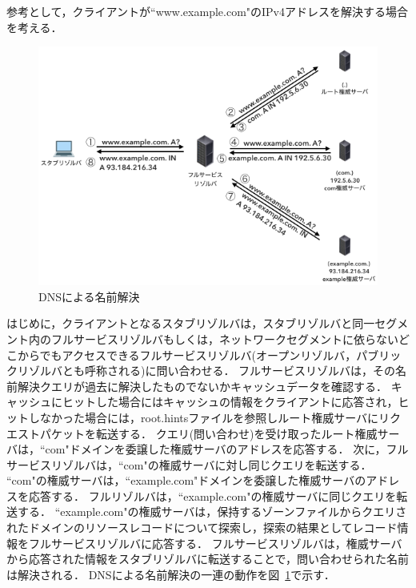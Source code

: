 参考として，クライアントが``www.example.com"のIPv4アドレスを解決する場合を考える．
\begin{figure}[H]
 \centering
 \includegraphics[width=12.0cm]{figure/dns-name-resolution.png}
 \caption{DNSによる名前解決}
 \label{fig:dns-name-resolution}
\end{figure}
はじめに，クライアントとなるスタブリゾルバは，スタブリゾルバと同一セグメント内のフルサービスリゾルバもしくは，ネットワークセグメントに依らないどこからでもアクセスできるフルサービスリゾルバ(オープンリゾルバ，パブリックリゾルバとも呼称される)に問い合わせる．
フルサービスリゾルバは，その名前解決クエリが過去に解決したものでないかキャッシュデータを確認する．
キャッシュにヒットした場合にはキャッシュの情報をクライアントに応答され，ヒットしなかった場合には，root.hintsファイルを参照しルート権威サーバにリクエストパケットを転送する．
クエリ(問い合わせ)を受け取ったルート権威サーバは，``com"ドメインを委譲した権威サーバのアドレスを応答する．
次に，フルサービスリゾルバは，``com"の権威サーバに対し同じクエリを転送する．
``com"の権威サーバは，``example.com"ドメインを委譲した権威サーバのアドレスを応答する．
フルリゾルバは，``example.com"の権威サーバに同じクエリを転送する．
``example.com"の権威サーバは，保持するゾーンファイルからクエリされたドメインのリソースレコードについて探索し，探索の結果としてレコード情報をフルサービスリゾルバに応答する．
フルサービスリゾルバは，権威サーバから応答された情報をスタブリゾルバに転送することで，問い合わせられた名前は解決される．
DNSによる名前解決の一連の動作を図~\ref{fig:dns-name-resolution}で示す．




\newpage
